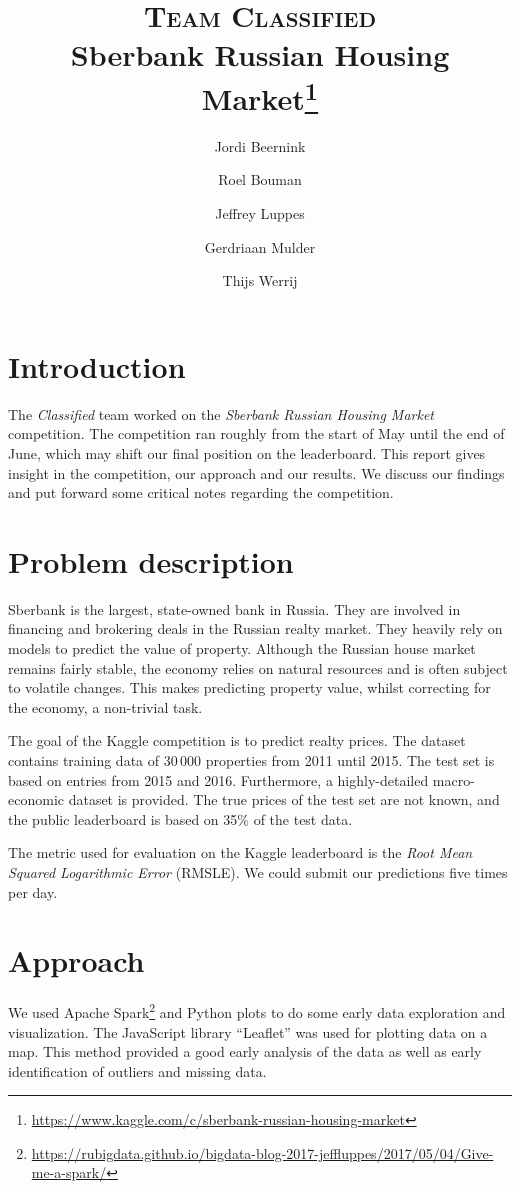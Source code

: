 \documentclass[a4paper,11pt,twocolumn]{article}
\title{\textsc{Team Classified} \\ \small{Sberbank Russian Housing
Market\footnote{\url{https://www.kaggle.com/c/sberbank-russian-housing-market}}}}
\author{Jordi Beernink \and Roel Bouman \and Jeffrey Luppes \and Gerdriaan Mulder \and Thijs Werrij}
\begin{document}
\maketitle

\section{Introduction}
The \emph{Classified} team worked on the \emph{Sberbank Russian Housing Market}
competition. The competition ran roughly from the start of May until the end of
June, which may shift our final position on the leaderboard. This report gives
insight in the competition, our approach and our results. We discuss our
findings and put forward some critical notes regarding the competition.

\section{Problem description}
Sberbank is the largest, state-owned bank in Russia. They are involved in
financing and brokering deals in the Russian realty market. They
heavily rely on models to predict the value of property. Although the Russian
house market remains fairly stable, the economy relies on natural resources
and is often subject to volatile changes. This makes predicting
property value, whilst correcting for the economy, a non-trivial task.

The goal of the Kaggle competition is to predict realty prices. The dataset
contains training data of 30\,000 properties from 2011 until
2015. The test set is based on entries from 2015 and 2016. Furthermore, a
highly-detailed macro-economic dataset is provided. The true prices of the test
set are not known, and the public leaderboard is based on 35\% of the test data.

The metric used for evaluation on the Kaggle leaderboard is the \emph{Root Mean Squared
Logarithmic Error} (\mbox{RMSLE}). We could submit our predictions five times
per day.

\section{Approach}

We used Apache
Spark\footnote{\url{https://rubigdata.github.io/bigdata-blog-2017-jeffluppes/2017/05/04/Give-me-a-spark/}}
and Python plots to do some early data exploration and visualization. The
JavaScript library ``Leaflet'' was used for plotting data on a map. This method
provided a good early analysis of the data as well as early identification of outliers and
missing data.
\end{document}
